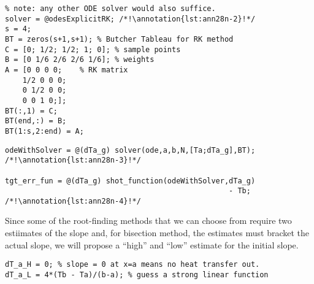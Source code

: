 \begin{lstlisting}[style=myMatlab,name=lec28n-ex1]
%% set RK4 solver tableau parameters
% note: any other ODE solver would also suffice.
solver = @odesExplicitRK; /*!\annotation{lst:ann28n-2}!*/
s = 4;
BT = zeros(s+1,s+1); % Butcher Tableau for RK method
C = [0; 1/2; 1/2; 1; 0]; % sample points
B = [0 1/6 2/6 2/6 1/6]; % weights
A = [0 0 0 0;    % RK matrix
    1/2 0 0 0;
    0 1/2 0 0;
    0 0 1 0;];
BT(:,1) = C;
BT(end,:) = B;
BT(1:s,2:end) = A;
\end{lstlisting}

\begin{lstlisting}[style=myMatlab,name=lec28n-ex1]
%% Commence Shooting Method
odeWithSolver = @(dTa_g) solver(ode,a,b,N,[Ta;dTa_g],BT); /*!\annotation{lst:ann28n-3}!*/

tgt_err_fun = @(dTa_g) shot_function(odeWithSolver,dTa_g) 
                                                   - Tb; /*!\annotation{lst:ann28n-4}!*/
\end{lstlisting}

Since some of the root-finding methods that we can choose from require two estiimates of the slope and, for bisection method, the estimates must bracket the actual slope, we will propose a ``high'' and ``low'' estimate for the initial slope.
\begin{lstlisting}[style=myMatlab,name=lec28n-ex1]
% need two guesses at the slope
dT_a_H = 0; % slope = 0 at x=a means no heat transfer out.
dT_a_L = 4*(Tb - Ta)/(b-a); % guess a strong linear function
\end{lstlisting}

